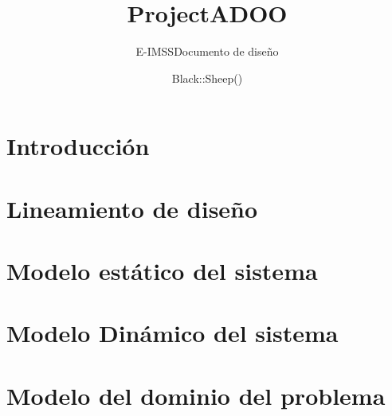 \documentclass[oneside,10pt]{book}
\title{ProjectADOO}
\subtitle{E-IMSS}
\subtitle{Documento de diseño}
\author{Black::Sheep()}
\begin{document}
\maketitle
\thispagestyle{empty}


\tableofcontents



\chapter{Introducción}


\chapter{Lineamiento de diseño}


\chapter{Modelo estático del sistema}




\chapter{Modelo Dinámico del sistema}


\chapter{Modelo del dominio del problema}



	
\end{document}
